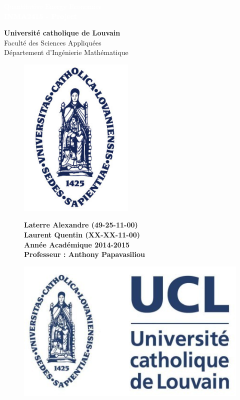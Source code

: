\begin{titlepage}
\centering
\BgThispage
{}
\vspace*{2.5cm}
\noindent
\textcolor{white}{\bigsf Quantitative Energy Economics\\ {\bf\vspace{0.5cm} \Huge INMA2415 - Project}}
\vspace*{2.3cm}\par
\noindent
%
\begin{center}
\textbf{\Large Université catholique de Louvain}  \\
Faculté des Sciences Appliquées \\
Département d’Ingénierie Mathématique \\
\vspace*{0.5cm}
\begin{figure}[!h]
	\centering
	\includegraphics[width=5.5cm]{images/logo.jpg}
\end{figure}
\end{center}
\vfill
\begin{figure}[b]
\centering
\textbf{\large Laterre Alexandre (49-25-11-00)} \\
\textbf{\large Laurent Quentin (XX-XX-11-00)} \\
\textbf{\large Année Académique 2014-2015} \\
\textbf{\large Professeur : Anthony Papavasiliou} \\
\begin{minipage}{0.2\linewidth}
	\includegraphics[scale=0.2]{images/logo_ucl.jpg}

\end{minipage}
\end{figure}
\end{titlepage}
